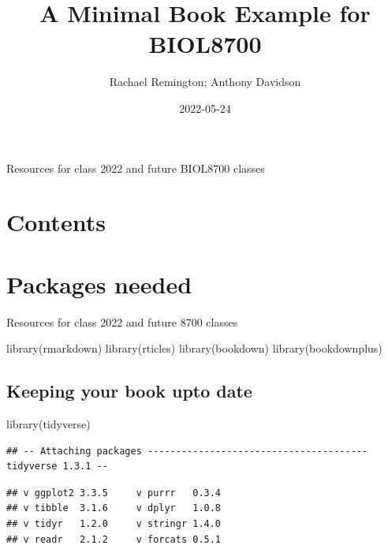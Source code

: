 \documentclass[
]{book}
\title{A Minimal Book Example for BIOL8700}
\author{Rachael Remington; Anthony Davidson}
\date{2022-05-24}
\newenvironment{Shaded}{\begin{snugshade}}{\end{snugshade}}
\newcommand{\FunctionTok}[1]{\textcolor[rgb]{0.00,0.00,0.00}{#1}}
\newcommand{\NormalTok}[1]{#1}
\begin{document}
\maketitle

{
\setcounter{tocdepth}{1}
\tableofcontents
}
Resources for class 2022 and future BIOL8700 classes

\hypertarget{contents}{%
\chapter{Contents}\label{contents}}

\hypertarget{packages-needed}{%
\chapter{Packages needed}\label{packages-needed}}

Resources for class 2022 and future 8700 classes

\begin{Shaded}
\begin{Highlighting}[]
\FunctionTok{library}\NormalTok{(rmarkdown)}
\FunctionTok{library}\NormalTok{(rticles)}
\FunctionTok{library}\NormalTok{(bookdown)}
\FunctionTok{library}\NormalTok{(bookdownplus)}
\end{Highlighting}
\end{Shaded}

\hypertarget{keeping-your-book-upto-date}{%
\section{Keeping your book upto date}\label{keeping-your-book-upto-date}}

\begin{Shaded}
\begin{Highlighting}[]
\FunctionTok{library}\NormalTok{(tidyverse)}
\end{Highlighting}
\end{Shaded}

\begin{verbatim}
## -- Attaching packages --------------------------------------- tidyverse 1.3.1 --
\end{verbatim}

\begin{verbatim}
## v ggplot2 3.3.5     v purrr   0.3.4
## v tibble  3.1.6     v dplyr   1.0.8
## v tidyr   1.2.0     v stringr 1.4.0
## v readr   2.1.2     v forcats 0.5.1
\end{verbatim}
\end{document}
